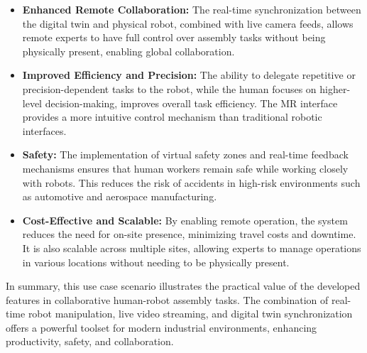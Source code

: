     \begin{itemize}
        \item \textbf{Enhanced Remote Collaboration:} The real-time synchronization between the digital twin and physical robot, combined with live camera feeds, allows remote experts to have full control over assembly tasks without being physically present, enabling global collaboration.
        
        \item \textbf{Improved Efficiency and Precision:} The ability to delegate repetitive or precision-dependent tasks to the robot, while the human focuses on higher-level decision-making, improves overall task efficiency. The \ac{MR} interface provides a more intuitive control mechanism than traditional robotic interfaces.
        
        \item \textbf{Safety:} The implementation of virtual safety zones and real-time feedback mechanisms ensures that human workers remain safe while working closely with robots. This reduces the risk of accidents in high-risk environments such as automotive and aerospace manufacturing.
    
        \item \textbf{Cost-Effective and Scalable:} By enabling remote operation, the system reduces the need for on-site presence, minimizing travel costs and downtime. It is also scalable across multiple sites, allowing experts to manage operations in various locations without needing to be physically present.
    
    \end{itemize}
    
    In summary, this use case scenario illustrates the practical value of the developed features in collaborative human-robot assembly tasks. The combination of real-time robot manipulation, live video streaming, and digital twin synchronization offers a powerful toolset for modern industrial environments, enhancing productivity, safety, and collaboration.
    